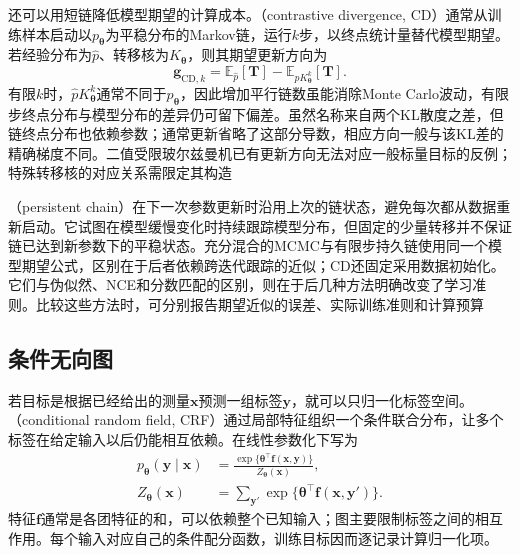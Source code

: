 还可以用短链降低模型期望的计算成本。（contrastive divergence, CD）通常从训练样本启动以$p_{\bm{\theta}}$为平稳分布的Markov链，运行$k$步，以终点统计量替代模型期望。若经验分布为$\widehat p$、转移核为$K_{\bm{\theta}}$，则其期望更新方向为
\[
  \bm{g}_{\mathrm{CD},k}
    =\mathbb{E}_{\widehat p}[\bm{T}]
      -\mathbb{E}_{\widehat pK_{\bm{\theta}}^k}[\bm{T}].
\]
有限$k$时，$\widehat pK_{\bm{\theta}}^k$通常不同于$p_{\bm{\theta}}$，因此增加平行链数虽能消除Monte Carlo波动，有限步终点分布与模型分布的差异仍可留下偏差。虽然名称来自两个KL散度之差，但链终点分布也依赖参数；通常更新省略了这部分导数，相应方向一般与该KL差的精确梯度不同。二值受限玻尔兹曼机已有更新方向无法对应一般标量目标的反例；特殊转移核的对应关系需限定其构造

（persistent chain）在下一次参数更新时沿用上次的链状态，避免每次都从数据重新启动。它试图在模型缓慢变化时持续跟踪模型分布，但固定的少量转移并不保证链已达到新参数下的平稳状态。充分混合的MCMC与有限步持久链使用同一个模型期望公式，区别在于后者依赖跨迭代跟踪的近似；CD还固定采用数据初始化。它们与伪似然、NCE和分数匹配的区别，则在于后几种方法明确改变了学习准则。比较这些方法时，可分别报告期望近似的误差、实际训练准则和计算预算

\subsection{条件无向图}
\label{sec:pgm-parameter-learning-conditional}

若目标是根据已经给出的测量$\bm{x}$预测一组标签$\bm{y}$，就可以只归一化标签空间。（conditional random field, CRF）通过局部特征组织一个条件联合分布，让多个标签在给定输入以后仍能相互依赖。在线性参数化下写为
\begin{equation}
  \begin{aligned}
    p_{\bm{\theta}}(\bm{y}\mid\bm{x})
      &=\frac{\exp\{\bm{\theta}^\top\bm{f}(\bm{x},\bm{y})\}}
              {Z_{\bm{\theta}}(\bm{x})},\\
    Z_{\bm{\theta}}(\bm{x})
      &=\sum_{\bm{y}'}
         \exp\{\bm{\theta}^\top\bm{f}(\bm{x},\bm{y}')\}.
  \end{aligned}
  \label{eq:pgm-parameter-learning-crf}
\end{equation}
特征$\bm{f}$通常是各团特征的和，可以依赖整个已知输入；图主要限制标签之间的相互作用。每个输入对应自己的条件配分函数，训练目标因而逐记录计算归一化项。

